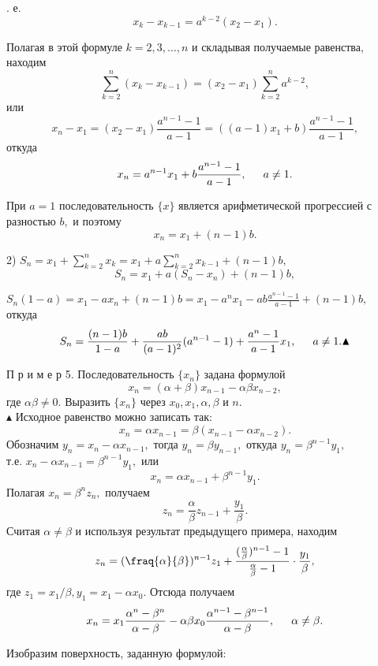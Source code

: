 \documentclass[12pt]{article}
\begin{document}
\newpage
\pagestyle{fancy}
\fancyhf{} 

{. е.
$$x_k-x_{k-1}=a^{k-2}(x_2-x_1).$$}

{\noindent Полагая в этой формуле $k=2,3,\ldots,n$ и складывая получаемые равенства, находим
$$\sum_{k=2}^{n}(x_k-x_{k-1})=(x_2-x_1)\sum_{k=2}^{n}a^{k-2},$$
или
$$x_n-x_1=(x_2-x_1)\frac{a^{n-1}-1}{a-1}=((a-1)x_1+b)\frac{a^{n-1}-1}{a-1},$$
откуда
$$x_n=a^{n-1}x_1+b\frac{a^{n-1}-1}{a-1},\indent a\neq 1.$$}

{\noindent При $a=1$ последовательность $\{x\}$ является арифметической прогрессией с разностью $b,$ и поэтому
$$x_n=x_1+(n-1)b.$$}

{2) $S_n=x_1+\sum\limits_{k=2}^{n}x_k=x_1+a\sum\limits_{k=2}^{n}x_{k-1}+(n-1)b,$\\
$$S_n=x_1+a(S_n-x_n)+(n-1)b,$$}

{$S_n(1-a)=x_1-ax_n+(n-1)b=x_1-a^n x_1-ab\frac{a^{n-1}-1}{a-1}+(n-1)b,$\\ откуда $$S_n=\frac{(n-1)b}{1-a} + \frac{ab}{(a-1)^2}(a^{n-1}-1)+\frac{a^n-1}{a-1}x_1, \indent a \neq 1. \blacktriangle$$}

{П р и м е р 5.} {Последовательность $\{x_n\}$ задана формулой $$x_n=(\alpha +\beta)x_{n-1}-\alpha\beta x_{n-2},$$
где $\alpha\beta\neq 0.$ Выразить $\{x_n\}$ через $x_0, x_1, \alpha, \beta$ и $n.$\\
\indent $\blacktriangle$ Исходное равенство можно записать так:
$$x_n=\alpha x_{n-1} = \beta (x_{n-1}-\alpha x_{n-2}).$$
Обозначим $y_n = x_n-\alpha x_{n-1},$ тогда $y_n=\beta y_{n-1},$ откуда $y_n=\beta ^{n-1}y_1,$\\ т.е. $x_n-\alpha x_{n-1} = \beta ^{n-1}y_1,$ или $$x_n=\alpha x_{n-1}+\beta ^{n-1}y_1.$$
Полагая $x_n=\beta ^n z_n,$ получаем
$$z_n=\frac{\alpha}{\beta}z_{n-1}+\frac{y_1}{\beta}.$$
Считая $\alpha \neq \beta$ и используя результат предыдущего примера, находим
$$z_n=(\fraq{\alpha}{\beta})^{n-1}z_1+\frac{(\frac{\alpha}{\beta})^{n-1}-1}{\frac{\alpha}{\beta}-1}\cdot \frac{y_1}{\beta},$$
где $z_1=x_1 / \beta, y_1=x_1-\alpha x_0.$ Отсюда получаем
$$x_n=x_1\frac{\alpha ^n - \beta ^n}{\alpha -\beta}-\alpha \beta x_0\frac{\alpha ^{n-1}-\beta ^{n-1}}{\alpha -\beta},\indent \alpha \neq \beta .$$}

\newpage
\pagestyle{fancy}
\fancyhf{} 

{
Изобразим поверхность, заданную формулой:
\begin{center}
    \\
\end{center}

\vspace{1cm}


\vspace{1cm}

}
\end{document}
